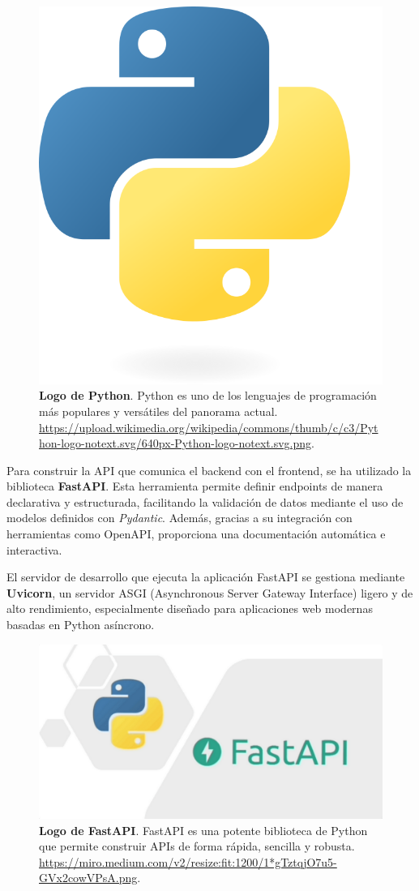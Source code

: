 \begin{figure}[H]
	\centering
	\includegraphics[width=0.5\linewidth]{imagenes/pythonLogo.png}
	\caption[\textbf{Logo de Python}.]{\textbf{Logo de Python}. Python es uno de los lenguajes de programación más populares y versátiles del panorama actual. \href{https://upload.wikimedia.org/wikipedia/commons/thumb/c/c3/Python-logo-notext.svg/640px-Python-logo-notext.svg.png}{https://upload.wikimedia.org/wikipedia/commons/thumb/c/c3/Python-logo-notext.svg/640px-Python-logo-notext.svg.png}.}
	\label{fig:python-logo}
\end{figure}

Para construir la API que comunica el backend con el frontend, se ha utilizado la biblioteca \textbf{FastAPI}. Esta herramienta permite definir endpoints de manera declarativa y estructurada, facilitando la validación de datos mediante el uso de modelos definidos con \textit{Pydantic}. Además, gracias a su integración con herramientas como OpenAPI, proporciona una documentación automática e interactiva.

El servidor de desarrollo que ejecuta la aplicación FastAPI se gestiona mediante \textbf{Uvicorn}, un servidor ASGI (Asynchronous Server Gateway Interface) ligero y de alto rendimiento, especialmente diseñado para aplicaciones web modernas basadas en Python asíncrono. \cite{lubanovic2023fastapi}  \cite{lathkar2023getting}

\begin{figure}[H]
	\centering
	\includegraphics[width=1\linewidth]{imagenes/fastapiLogo.png}
	\caption[\textbf{Logo de FastAPI}.]{\textbf{Logo de FastAPI}. FastAPI es una potente biblioteca de Python que permite construir APIs de forma rápida, sencilla y robusta. \href{https://miro.medium.com/v2/resize:fit:1200/1*gTztqjO7u5-GVx2cowVPsA.png}{https://miro.medium.com/v2/resize:fit:1200/1*gTztqjO7u5-GVx2cowVPsA.png}.}
	\label{fig:fastapi-logo}
\end{figure}

